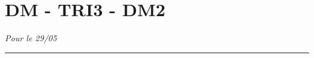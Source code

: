 \documentclass[11pt]{article}
\newcommand{\horrule}[1]{\rule{\linewidth}{#1}} %
\begin{document}

\newtheorem{Definition}{Définition}
\newtheorem{Theorem}{Théorème}
\newtheorem{Proposition}{Propriété}

\renewcommand{\labelitemi}{$\bullet$}
\renewcommand{\labelitemii}{$\circ$}

\setlength{\columnseprule}{0pt}

\section*{DM - TRI3 - DM2}
\textit{Pour le 29/05}
\horrule{2px} 
\end{document}
